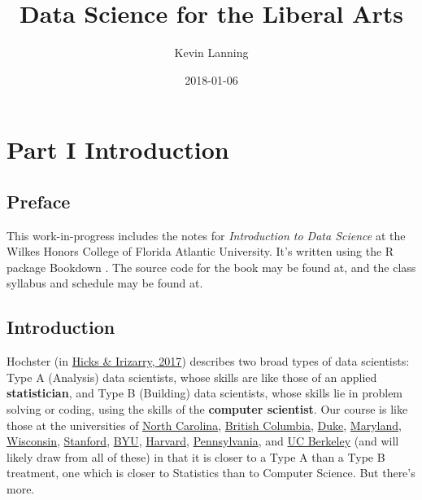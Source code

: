 \documentclass[]{book}
\title{Data Science for the Liberal Arts}
\author{Kevin Lanning}
\date{2018-01-06}
\theoremstyle{definition}
\theoremstyle{definition}
\theoremstyle{definition}
\theoremstyle{remark}
\begin{document}
\maketitle

{
\setcounter{tocdepth}{1}
\tableofcontents
}
\hypertarget{part-part-i-introduction}{%
\part{Part I Introduction}\label{part-part-i-introduction}}

\hypertarget{preface}{%
\chapter{Preface}\label{preface}}

This work-in-progress includes the notes for \emph{\emph{Introduction to
Data Science}} at the Wilkes Honors College of Florida Atlantic
University. It's written using the R package Bookdown
\citep{R-bookdown}. The source code for the book may be found at, and
the class syllabus and schedule may be found at.

\hypertarget{introduction}{%
\chapter{Introduction}\label{introduction}}

Hochster (in
\href{https://arxiv.org/ftp/arxiv/papers/1612/1612.07140.pdf}{Hicks \&
Irizarry, 2017}) describes two broad types of data scientists: Type A
(Analysis) data scientists, whose skills are like those of an applied
\textbf{statistician}, and Type B (Building) data scientists, whose
skills lie in problem solving or coding, using the skills of the
\textbf{computer scientist}. Our course is like those at the
universities of \href{https://idc9.github.io/stor390/}{North Carolina},
\href{https://github.com/STAT545-UBC/STAT545-UBC.github.io}{British
Columbia},
\href{https://www2.stat.duke.edu/courses/Fall15/sta112.01/}{Duke},
\href{http://www.hcbravo.org/IntroDataSci/calendar/}{Maryland},
\href{http://pages.stat.wisc.edu/~yandell/R_for_data_sciences/syllabus.html}{Wisconsin},
\href{https://github.com/dcl-2017-04/curriculum}{Stanford},
\href{https://byuistats.github.io/M335/syllabus.html}{BYU},
\href{http://datasciencelabs.github.io/}{Harvard},
\href{https://github.com/MUSA-620-Spring-2017/Course-Materials}{Pennsylvania},
and \href{https://github.com/FAUDataScience/stat259}{UC Berkeley} (and
will likely draw from all of these) in that it is closer to a Type A
than a Type B treatment, one which is closer to Statistics than to
Computer Science. But there's more.
\end{document}
